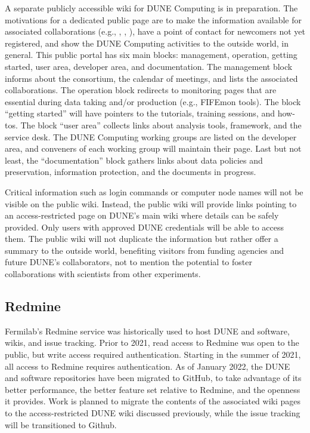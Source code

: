 \documentclass[../main-v1.tex]{subfiles}
\begin{document}
A separate publicly accessible wiki for DUNE Computing is in preparation. The motivations for a dedicated public page are to make the information available for associated collaborations (e.g., , , ), have a point of contact for newcomers not yet registered, and show the DUNE Computing activities to the outside world, in general. This public portal has six main blocks: management, operation, getting started, user area, developer area, and documentation. The management block informs about the consortium, the calendar of meetings, and lists the associated collaborations. The operation block redirects to monitoring pages that are essential during data taking and/or production (e.g., FIFEmon tools). The block ``getting started'' will have pointers to the tutorials, training sessions, and how-tos. The block ``user area'' collects links about analysis tools, framework, and %
the  service desk. The DUNE Computing working groups are listed on the developer area, and conveners of each working group will maintain their page. Last but not least, the ``documentation'' block gathers links about data policies and preservation, information protection, and the documents in progress.

Critical information such as login commands or computer node names will not be visible on the public wiki. Instead, the public wiki will provide links pointing to an access-restricted page on DUNE’s main wiki where details can be safely provided. Only users with approved DUNE credentials will be able to access them. The public wiki will not duplicate the information but rather offer a summary to the outside world, benefiting visitors from funding agencies and future DUNE’s %
collaborators, not to mention the potential to foster collaborations with scientists from other experiments.


\subsection{Redmine}

Fermilab's Redmine service was historically used to host DUNE  and  software, wikis, and issue tracking.  Prior to 2021, read access to Redmine was open to the public, but write access required authentication.  Starting in the summer of 2021, all access to Redmine requires authentication.  As of January 2022, the DUNE  and  software repositories have been migrated to GitHub, to take advantage of its better performance, the better feature set %
relative to Redmine, and the openness it provides. Work is planned to migrate the contents of the associated wiki pages to the access-restricted DUNE wiki discussed previously, while the issue tracking will be transitioned to Github.
\end{document}
